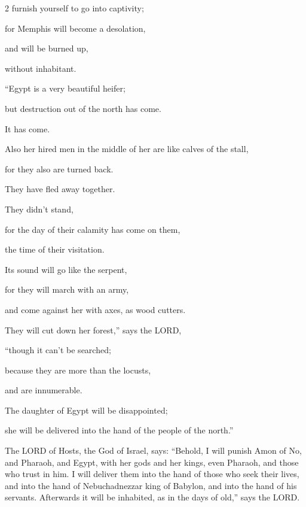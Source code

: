 \begin{multicols}{2}
furnish yourself to go into captivity;

for Memphis will become a desolation,

and will be burned up,

without inhabitant.

\vspace{\baselineskip}

\myverse{}“Egypt is a very beautiful heifer;

but destruction out of the north has come.

It has come.


\myverse{}Also her hired men in the middle of her are like calves of
the stall,

for they also are turned back.

They have fled away together.

They didn’t stand,

for the day of their calamity has come on them,

the time of their visitation.


\myverse{}Its sound will go like the serpent,

for they will march with an army,

and come against her with axes, as wood cutters.


\myverse{}They will cut down her forest,” says the LORD,

“though it can’t be searched;

because they are more than the locusts,

and are innumerable.


\myverse{}The daughter of Egypt will be disappointed;

she will be delivered into the hand of the people of the north.”

\end{multicols}

\myverse{}The LORD of Hosts, the God of Israel, says: “Behold, I will punish Amon of No, and Pharaoh, and Egypt, with her gods and her kings, even Pharaoh, and those who trust in him. \myverse{}I will deliver them into the hand of those who seek their lives, and into the hand of Nebuchadnezzar king of Babylon, and into the hand of his servants. Afterwards it will be inhabited, as in the days of old,” says the LORD.

